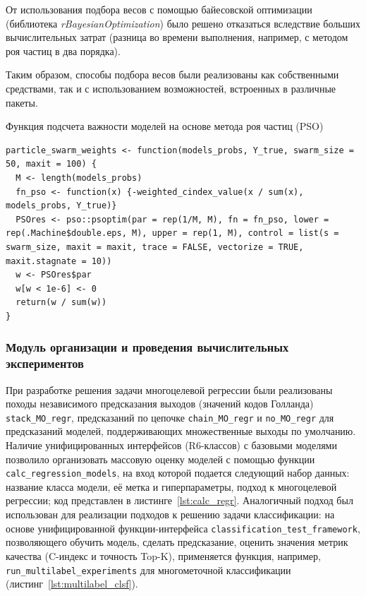 От использования подбора весов с помощью байесовской оптимизации (библиотека \emph{rBayesianOptimization}) было решено отказаться вследствие больших вычислительных затрат (разница во времени выполнения, например, с методом роя частиц в два порядка).

Таким образом, способы подбора весов были реализованы как собственными средствами, так и с использованием возможностей, встроенных в различные пакеты.

\begin{listing}
    \caption{Функция подсчета важности моделей на основе метода роя частиц (PSO)}
    \label{lst:weight_optim_pso}
    \begin{verbatim}
particle_swarm_weights <- function(models_probs, Y_true, swarm_size = 50, maxit = 100) {
  M <- length(models_probs)
  fn_pso <- function(x) {-weighted_cindex_value(x / sum(x), models_probs, Y_true)}
  PSOres <- pso::psoptim(par = rep(1/M, M), fn = fn_pso, lower = rep(.Machine$double.eps, M), upper = rep(1, M), control = list(s = swarm_size, maxit = maxit, trace = FALSE, vectorize = TRUE, maxit.stagnate = 10))
  w <- PSOres$par
  w[w < 1e-6] <- 0
  return(w / sum(w))
}
  \end{verbatim}
\end{listing}


\subsubsection{Модуль организации и проведения вычислительных экспериментов}

При разработке решения задачи многоцелевой регрессии были реализованы походы независимого предсказания выходов (значений кодов Голланда) \lstinline{stack_MO_regr}, предсказаний по цепочке \lstinline{chain_MO_regr} и \lstinline{no_MO_regr} для предсказаний моделей, поддерживающих множественные выходы по умолчанию. Наличие унифицированных интерфейсов (R6-классов) с базовыми моделями позволило организовать массовую оценку моделей с помощью функции \lstinline{calc_regression_models}, на вход которой подается следующий набор данных: название класса модели, её метка и гиперпараметры, подход к многоцелевой регрессии; код представлен в листинге~\ref{lst:calc_regr}. Аналогичный подход был использован для реализации подходов к решению задачи классификации: на основе унифицированной функции-интерфейса \lstinline{classification_test_framework}, позволяющего обучить модель, сделать предсказание, оценить значения метрик качества (C-индекс и точность Top-K), применяется функция, например, \lstinline{run_multilabel_experiments} для многометочной классификации (листинг~\ref{lst:multilabel_clsf}).

